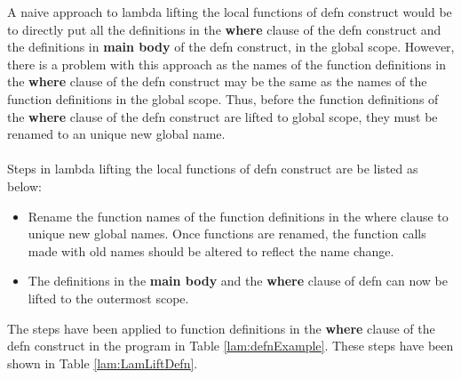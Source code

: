 \documentclass[11pt]{article}
\begin{document}
A naive approach to lambda lifting the local functions of {\sf defn} construct would be to directly put all the definitions in the {\bf where} clause of the {\sf defn} construct  and the definitions in {\bf main body} of the {\sf defn} construct, in the global scope. However, there is a problem with this approach as the names of the function definitions in the {\bf where} clause of the {\sf defn} construct may be the same as the names of the function definitions in the global scope. Thus, before the function definitions of the {\bf where} clause of the {\sf defn} construct are lifted to global scope, they must be renamed to an unique new global name.
~~\\~~\\ 
Steps in lambda lifting the local functions of {\sf defn} construct are be listed as below:
\begin{itemize}
  \item Rename the function names of the function definitions in the {\sf where} clause to unique new global names. Once functions are renamed, the function calls made with old names should be altered to reflect the name change.
  \item The definitions in the {\bf main body} and the {\bf where} clause of defn can now be lifted to the outermost scope.
\end{itemize}
The steps have been applied to function definitions in the {\bf where} clause of the {\sf defn} construct in the program in Table \ref {lam:defnExample}. These steps have been shown in Table \ref {lam:LamLiftDefn}.
\end{document}
